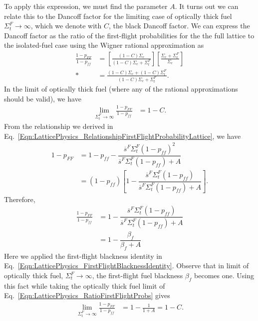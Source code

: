 To apply this expression, we must find the parameter $A$. It turns out we can relate this to the Dancoff factor for the limiting case of optically thick fuel $\Sigma_t^F \rightarrow \infty$, which we denote with $C$, the black Dancoff factor. We can express the Dancoff factor as the ratio of the first-flight probabilities for the the full lattice to the isolated-fuel case using the Wigner rational approximation as
\begin{align}
  \frac{ 1 - p_{FF} }{ 1 - p_{ff} } &= 
  \left[ \frac{ ( 1 - C ) \Sigma_e }{ ( 1 - C ) \Sigma_e + \Sigma_t^F } \right]
  \left[ \frac{ \Sigma_e  + \Sigma_t^F }{ \Sigma_e  } \right] \nonumber \\*
  &= \frac{ ( 1 - C ) \Sigma_e  + ( 1 - C ) \Sigma_t^F }{ ( 1 - C ) \Sigma_e  + \Sigma_t^F } .
\end{align}
In the limit of optically thick fuel (where any of the rational approximations should be valid), we have
\begin{align}
  \lim_{\Sigma_t^F \rightarrow \infty} \frac{ 1 - p_{FF} }{ 1 - p_{ff} } &= 1 - C .
\end{align}
From the relationship we derived in Eq.~\eqref{Eqn:LatticePhysics_RelationshipFirstFlightProbabilityLattice}, we have
\begin{align}
  1 - p_{FF} &= 1 - p_{ff} -  \dfrac{ \overline{s}^F \Sigma_t^F ( 1 - p_{ff})^2  }{  \overline{s}^F \Sigma_t^F ( 1 - p_{ff} ) + A } \nonumber \\
  &= ( 1 - p_{ff} ) \left[ 1 - \dfrac{ \overline{s}^F \Sigma_t^F ( 1 - p_{ff}) }{  \overline{s}^F \Sigma_t^F ( 1 - p_{ff} ) + A } \right] .
\end{align}
Therefore,
\begin{align}
  \frac{1 - p_{FF}}{1 - p_{ff}} &=  1 - \dfrac{ \overline{s}^F \Sigma_t^F ( 1 - p_{ff}) }{  \overline{s}^F \Sigma_t^F ( 1 - p_{ff} ) + A }  \nonumber \\
  &= 1 - \dfrac{ \beta_f }{  \beta_f + A }\label{Eqn:LatticePhysics_RatioFirstFlightProbs}
\end{align}
Here we applied the first-flight blackness identity in Eq.~\eqref{Eqn:LatticePhysics_FirstFlightBlacknessIdentity}. Observe that in limit of optically thick fuel, $\Sigma_t^F \rightarrow \infty$, the first-flight fuel blackness $\beta_f$ becomes one. Using this fact while taking the optically thick fuel limit of Eq.~\eqref{Eqn:LatticePhysics_RatioFirstFlightProbs} gives
\begin{align}
  \lim_{\Sigma_t^F \rightarrow \infty} \frac{ 1 - p_{FF} }{ 1 - p_{ff} } &= 1 - \frac{1}{1+A} = 1 - C.
\end{align}
